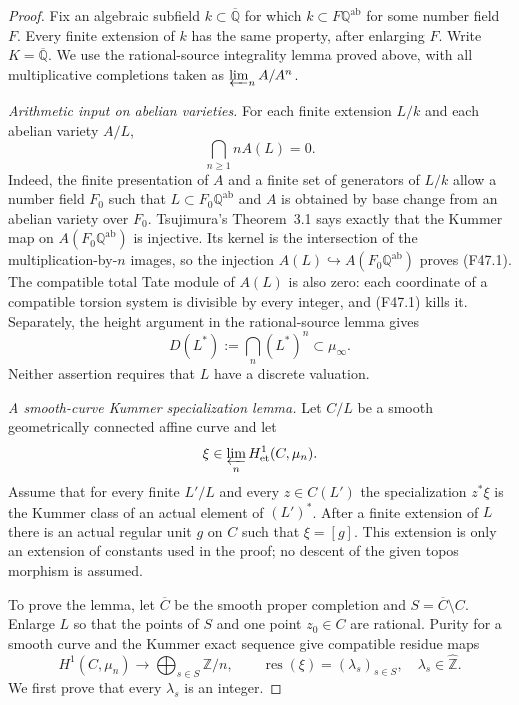 \begin{proof}
Fix an algebraic subfield $k\subset\overline{\mathbb Q}$ for which
$k\subset F\mathbb Q^{\mathrm{ab}}$ for some number field $F$.
Every finite extension of $k$ has the same property, after enlarging
$F$. Write $K=\overline{\mathbb Q}$. We use the rational-source
integrality lemma proved above, with all multiplicative completions
taken as $\varprojlim_n A/A^n$.

\emph{Arithmetic input on abelian varieties.}
For each finite extension $L/k$ and each abelian variety $A/L$,
\[
 \bigcap_{n\geq1} nA(L)=0.                                  \tag{F47.1}
\]
Indeed, the finite presentation of $A$ and a finite set of generators
of $L/k$ allow a number field $F_0$ such that
$L\subset F_0\mathbb Q^{\mathrm{ab}}$ and $A$ is obtained by base
change from an abelian variety over $F_0$. Tsujimura's
Theorem~3.1 \citep{Tsujimura2020} says exactly that the Kummer map
on $A(F_0\mathbb Q^{\mathrm{ab}})$ is injective. Its kernel is the
intersection of the multiplication-by-$n$ images, so the injection
$A(L)\hookrightarrow A(F_0\mathbb Q^{\mathrm{ab}})$ proves
(F47.1). The compatible total Tate module of $A(L)$ is also zero:
each coordinate of a compatible torsion system is divisible by every
integer, and (F47.1) kills it. Separately, the height argument in the
rational-source lemma gives
\[
 D(L^*):=\bigcap_n(L^*)^n\subset\mu_\infty.                  \tag{F47.2}
\]
Neither assertion requires that $L$ have a discrete valuation.

\emph{A smooth-curve Kummer specialization lemma.}
Let $C/L$ be a smooth geometrically connected affine curve and let
\[
 \xi\in\varprojlim_n H^1_{\mathrm{et}}(C,\mu_n).
\]
Assume that for every finite $L'/L$ and every $z\in C(L')$ the
specialization $z^*\xi$ is the Kummer class of an actual element of
$(L')^*$. After a finite extension of $L$ there is an actual regular
unit $g$ on $C$ such that $\xi=[g]$. This extension is only an
extension of constants used in the proof; no descent of the given
topos morphism is assumed.

To prove the lemma, let $\overline C$ be the smooth proper completion
and $S=\overline C\setminus C$. Enlarge $L$ so that the points of
$S$ and one point $z_0\in C$ are rational. Purity for a smooth curve
and the Kummer exact sequence give compatible residue maps
\[
 H^1(C,\mu_n)\longrightarrow
       \bigoplus_{s\in S}\mathbb Z/n,
 \qquad
 \operatorname{res}(\xi)=(\lambda_s)_{s\in S},
 \quad\lambda_s\in\widehat{\mathbb Z}.                    \tag{F47.3}
\]
We first prove that every $\lambda_s$ is an integer.


\end{proof}

